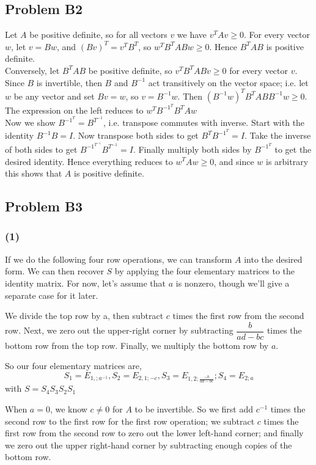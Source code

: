 \documentclass{article}
\begin{document}
\subsection{Problem B2}
Let $A$ be positive definite, so for all vectors $v$ we have $v^TAv\ge 0$. For every vector $w$, let $v=Bw$, and $(Bv)^T=v^TB^T$, so $w^TB^TABw\ge 0$. Hence $B^TAB$ is positive definite.
\\Conversely, let $B^TAB$ be positive definite, so $v^TB^TABv \ge 0$ for every vector $v$. Since $B$ is invertible, then $B$ and $B^{-1}$ act transitively on the vector space; i.e. let $w$ be any vector and set $Bv=w$, so $v=B^{-1}w$. Then $(B^{-1}w)^TB^TABB^{-1}w\ge 0$. The expression on the left reduces to $w^TB^{-1^T}B^TAw$
\\Now we show $B^{-1^T}=B^{T^{-1}}$, i.e. transpose commutes with inverse. Start with the identity $B^{-1}B=I$. Now transpose both sides to get $B^TB^{-1^T}=I$. Take the inverse of both sides to get $B^{-1^{T^{-1}}}B^{T^{-1}}=I$. Finally multiply both sides by $B^{-1^T}$ to get the desired identity. 
Hence everything reduces to $w^TAw\ge 0$, and since $w$ is arbitrary this shows that $A$ is positive definite. 

\subsection{Problem B3}
\subsubsection{(1)}
If we do the following four row operations, we can transform $A$ into the
desired form. We can then recover $S$ by applying the four elementary matrices
to the identity matrix. For now, let's assume that $a$ is nonzero, though we'll
give a separate case for it later.

We divide the top row by a, then subtract $c$ times the first row from the
second row. Next, we zero out the upper-right corner by subtracting
$\dfrac{b}{ad-bc}$ times the bottom row from the top row. Finally, we multiply
the bottom row by $a$.

So our four elementary matrices are,
\[S_1 = E_{1,;a^{-1}}, S_2 = E_{2,1;-c}, S_3 = E_{1,2 ; \frac{-b}{ad-bc}};
S_4 = E_{2; a}\]
with $S = S_4 S_3 S_2 S_1$

When $a = 0$, we know $c \neq 0$ for $A$ to be invertible. So we first add
$c^{-1}$ times the second row to the first row for the first row operation; we
subtract $c$ times the first row from the second row to zero out the lower
left-hand corner; and finally we zero out the upper right-hand corner by
subtracting enough copies of the bottom row.
\end{document}
